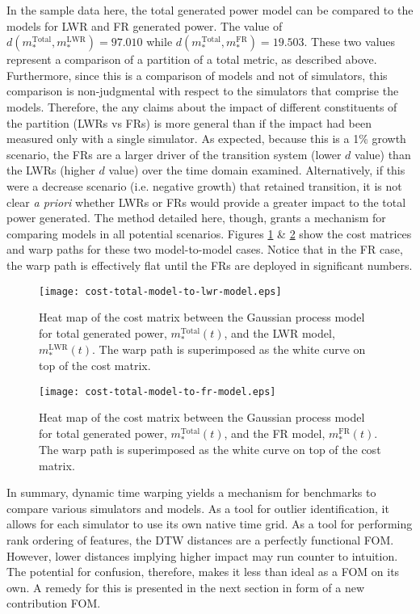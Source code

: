 \documentclass{ntmanuscript}
\newcommand{\LWR}{\mathrm{LWR}}
\newcommand{\FR}{\mathrm{FR}}
\newcommand{\Total}{\mathrm{Total}}
\begin{document}
In the sample data here, the total generated power model can be compared to
the models for LWR and FR generated power. The value of
$d(m_*^\Total, m_*^\LWR) = 97.010$ while $d(m_*^\Total, m_*^\FR) = 19.503$.
These two values represent a comparison of a partition of a total metric,
as described above.  Furthermore, since this is a comparison of models and not
of simulators, this comparison is non-judgmental with respect to the
simulators that comprise the models. Therefore, the any claims about the
impact of different constituents of the partition (LWRs vs FRs) is more general
than if the impact had been measured only with a single simulator.
As expected, because this is a 1\% growth scenario, the FRs are a larger
driver of the transition system (lower $d$ value) than the
LWRs (higher $d$ value) over the time domain examined. Alternatively, if this
were a decrease scenario (i.e. negative growth)
that retained transition, it is not clear \emph{a priori} whether LWRs or FRs would
provide a greater impact to the total power generated. The method detailed
here, though, grants a mechanism for comparing models in all potential
scenarios. Figures
\ref{cost-total-model-to-lwr-model} \& \ref{cost-total-model-to-fr-model}
show the cost matrices and warp paths for these two model-to-model cases.
Notice that in the
FR case, the warp path is effectively flat until the FRs are deployed in
significant numbers.

\begin{figure}[htb]
\centering
\texttt{[image: cost-total-model-to-lwr-model.eps]}
\caption{Heat map of the cost matrix between the Gaussian process model
for total generated power, $m_*^\Total(t)$, and the LWR model,
$m_*^\LWR(t)$.
The warp path is superimposed as the white curve on top of the cost matrix.}
\label{cost-total-model-to-lwr-model}
\end{figure}

\begin{figure}[htb]
\centering
\texttt{[image: cost-total-model-to-fr-model.eps]}
\caption{Heat map of the cost matrix between the Gaussian process model
for total generated power, $m_*^\Total(t)$, and the FR model,
$m_*^\FR(t)$.
The warp path is superimposed as the white curve on top of the cost matrix.}
\label{cost-total-model-to-fr-model}
\end{figure}

In summary, dynamic time warping yields a mechanism for benchmarks to
compare various simulators and models. As a tool for
outlier identification, it allows for each simulator to use its own native
time grid. As a tool for performing rank ordering of features, the DTW distances
are a perfectly functional FOM. However, lower distances implying higher
impact may run counter to intuition. The potential for confusion, therefore,
makes it less than ideal as a FOM on its own. A remedy for this is presented
in the next section in form of a new contribution FOM.
\end{document}
